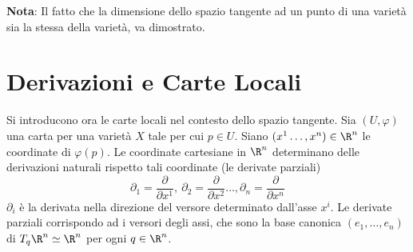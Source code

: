 \documentclass[10pt, letterpaper]{report}
\begin{document}
\noindent\textbf{Nota}: Il fatto che la dimensione dello spazio tangente ad un punto di una varietà sia la stessa della varietà, va dimostrato.
\section{Derivazioni e Carte Locali}
Si introducono ora le carte locali nel contesto dello spazio tangente. Sia $(U,\varphi)$ una carta per una varietà $X$ tale per cui $p\in U$. Siano $(x^1\dots,x^n)\in\R^n$ le coordinate di $\varphi(p)$. Le coordinate cartesiane in $\R^n$ determinano delle derivazioni naturali rispetto tali coordinate (le derivate parziali)\begin{equation}
    \partial_1=\frac{\partial}{\partial x^1}, \ \partial_2=\frac{\partial}{\partial x^2}\dots,\partial_n=\frac{\partial}{\partial x^n}
\end{equation}
$\partial_i$ è la derivata nella direzione del versore determinato dall'asse $x^i$. Le derivate parziali corrispondo ad i versori degli assi, che sono la base canonica $(e_1,\dots,e_n)$ di $T_q\R^n\simeq\R^n$ per ogni $q\in\R^n$.\bigskip
\end{document}
